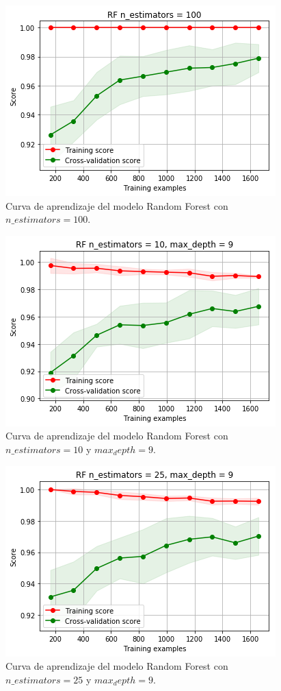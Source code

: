 \documentclass[11pt,a4paper]{article}
\begin{document}
\begin{figure}[H]
    \centering
    \includegraphics[scale=0.7]{img/lc-rf-n-100.png}
    \caption{Curva de aprendizaje del modelo Random Forest con $n\_estimators=100$.}
    \label{fig:lc-rf-n-100}
\end{figure}

\begin{figure}[H]
    \centering
    \includegraphics[scale=0.7]{img/lc-rf-n-10-d-9.png}
    \caption{Curva de aprendizaje del modelo Random Forest con $n\_estimators=10$ y $max_depth=9$.}
    \label{fig:lc-rf-n-10-d-9}
\end{figure}

\begin{figure}[H]
    \centering
    \includegraphics[scale=0.7]{img/lc-rf-n-25-d-9.png}
    \caption{Curva de aprendizaje del modelo Random Forest con $n\_estimators=25$ y $max_depth=9$.}
    \label{fig:lc-rf-n-25-d-9}
\end{figure}
\end{document}
